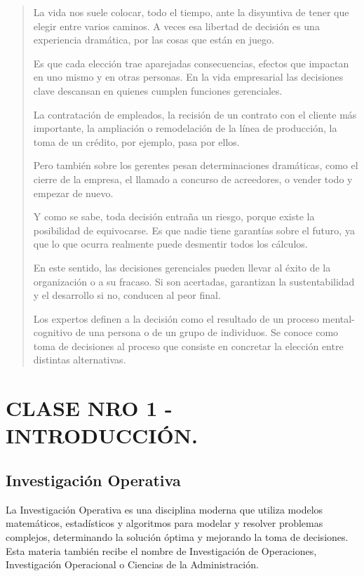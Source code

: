 \documentclass[12pt]{book}
\begin{document}
\begin{verse}



La vida nos suele colocar, todo el tiempo, ante la disyuntiva de tener que elegir entre varios caminos. A veces esa libertad de decisión es una experiencia dramática, por las cosas que están en juego.

Es que cada elección trae aparejadas consecuencias, efectos que impactan en uno mismo y en otras personas. En la vida empresarial las decisiones clave descansan en quienes cumplen funciones gerenciales.

La contratación de empleados, la recisión de un contrato con el cliente más importante, la ampliación o remodelación de la línea de producción, la toma de un crédito, por ejemplo, pasa por ellos.

Pero también sobre los gerentes pesan determinaciones dramáticas, como el cierre de la empresa, el llamado a concurso de acreedores, o vender todo y empezar de nuevo.

Y como se sabe, toda decisión entraña un riesgo, porque existe la posibilidad de equivocarse. Es que nadie tiene garantías sobre el futuro, ya que lo que ocurra realmente puede desmentir todos los cálculos.

En este sentido, las decisiones gerenciales pueden llevar al éxito de la organización o a su fracaso. Si son acertadas, garantizan la sustentabilidad y el desarrollo si no, conducen al peor final.

Los expertos definen a la decisión como el resultado de un proceso mental-cognitivo de una persona o de un grupo de individuos. Se conoce como toma de decisiones al proceso que consiste en concretar la elección entre distintas alternativas.

\end{verse}



\chapter{CLASE NRO 1 - INTRODUCCI\'ON.}

\section{Investigación Operativa}
La Investigación Operativa es una disciplina moderna que utiliza modelos matemáticos, estadísticos y algoritmos para modelar y resolver problemas complejos, determinando la solución óptima y mejorando la toma de decisiones. Esta materia también recibe el nombre de Investigación de Operaciones, Investigación Operacional o Ciencias de la Administración.
\end{document}
